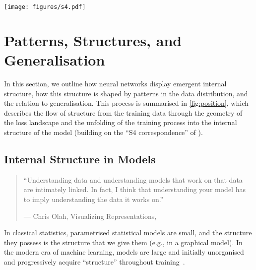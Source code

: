 \begin{figure*}[ht!]
    \centering
    \texttt{[image: figures/s4.pdf]}
    \caption{\textbf{From data to model behaviour}: Structure in data determines internal structure in models and thus generalisation. Current approaches to alignment work by shaping the training distribution (left), which only indirectly determines model structure (right) through the effects on shaping the optimisation process (middle left \& right). To mitigate the limitations of this indirect approach, alignment requires a better understanding of these intermediate links (loss visualisation from \citealt{li2018visualizing}; ``S4 correspondence'' based on~\citealt{wang2024differentiation}).}
    \label{fig:position}
\end{figure*}



\section{Patterns, Structures, and Generalisation}\label{section:s4}

In this section, we outline how neural networks display emergent internal structure, how this structure is shaped by patterns in the data distribution, and the relation to generalisation.
% 
This process is summarised in \cref{fig:position}, which describes the flow of structure from the training data through the geometry of the loss landscape and the unfolding of the training process into the internal structure of the model (building on the ``S4 correspondence'' of \citealt{wang2024differentiation}).

\subsection{Internal Structure in Models}

\begin{quote}
``Understanding data and understanding models that work on that data are intimately linked. In fact, I think that understanding your model has to imply understanding the data it works on.''
\begin{flushright}
--- Chris Olah, Visualizing Representations,  \citeyear{olah2015visualizing}
\end{flushright}
\end{quote}

In classical statistics, parametrised statistical models are small, and the structure they possess is the structure that we give them (e.g., in a graphical model). In the modern era of machine learning, models are large and initially unorganised and progressively acquire ``structure'' throughout training~\citep{nanda2023progress,wang2024differentiation,tigges2024llm}.

